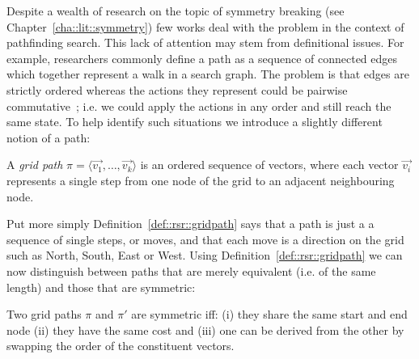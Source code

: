 Despite a wealth of research on the topic of symmetry breaking (see
Chapter~\ref{cha::lit::symmetry}) few works deal with the problem in the
context of pathfinding search.  This lack of attention may stem from
definitional issues. For example, researchers commonly define a path as a
sequence of connected edges which together represent a walk in a search graph.
The problem is that edges are strictly ordered whereas the actions they
represent could be pairwise commutative~\citep{haslum00}; i.e. we could apply
the actions in any order and still reach the same state.  To help identify
such situations we introduce a slightly different notion of a path:

\begin{definition}
\label{def::rsr::gridpath}
A \emph{grid path} $\pi = \langle \vec{v_1}, \ldots, \vec{v_k} \rangle$ is an ordered sequence 
of vectors, where each vector $\vec{v_i}$ represents a single step from one node of 
the grid to an adjacent neighbouring node. 
\end{definition}

Put more simply Definition~\ref{def::rsr::gridpath} says that a path is just a
a sequence of single steps, or moves, and that each move is a direction on the 
grid such as North, South, East or West. Using
Definition~\ref{def::rsr::gridpath} we can now distinguish between paths that
are merely equivalent (i.e. of the same length) and those that are symmetric:

\begin{definition}
Two grid paths $\pi$ and $\pi'$ are symmetric iff: (i) they share the same 
start and end node (ii) they have the same cost and (iii) one can be derived from 
the other by swapping the order of the constituent vectors.
\end{definition}


